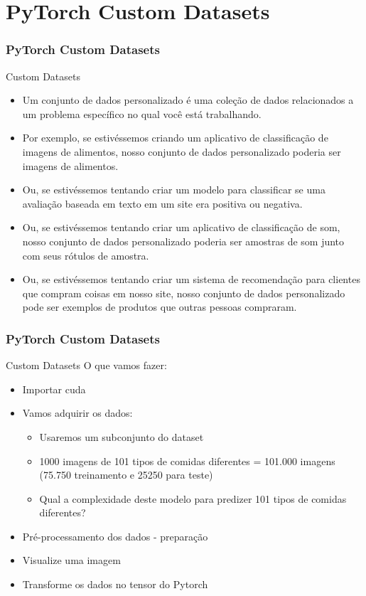 \documentclass{beamer}
\begin{document}
\section{PyTorch Custom Datasets}
\begin{frame}
	\frametitle{PyTorch Custom Datasets}
	\begin{block}{Custom Datasets}
		
		\begin{itemize}
			\item Um conjunto de dados personalizado é uma coleção de dados relacionados a um problema específico no qual você está trabalhando.
			\item Por exemplo, se estivéssemos criando um aplicativo de classificação de imagens de alimentos, nosso conjunto de dados personalizado poderia ser imagens de alimentos.
			\item Ou, se estivéssemos tentando criar um modelo para classificar se uma avaliação baseada em texto em um site era positiva ou negativa.
			\item Ou, se estivéssemos tentando criar um aplicativo de classificação de som, nosso conjunto de dados personalizado poderia ser amostras de som junto com seus rótulos de amostra.
			\item Ou, se estivéssemos tentando criar um sistema de recomendação para clientes que compram coisas em nosso site, nosso conjunto de dados personalizado pode ser exemplos de produtos que outras pessoas compraram.
		\end{itemize}
	\end{block}
\end{frame}
\begin{frame}
	\frametitle{PyTorch Custom Datasets}
	\begin{block}{Custom Datasets}
		O que vamos fazer:
		\begin{itemize}
			\item Importar cuda
			\item Vamos adquirir os dados:
			\begin{itemize}
				\item Usaremos um subconjunto do dataset \href{https://data.vision.ee.ethz.ch/cvl/datasets_extra/food-101/}{} 
				\item 1000 imagens de 101 tipos de comidas diferentes = 101.000 imagens (75.750 treinamento e 25250 para teste)
				\item Qual a complexidade deste modelo para predizer 101 tipos de comidas diferentes?
			\end{itemize}
			\item Pré-processamento dos dados - preparação
			\item Visualize uma imagem
			\item Transforme os dados no tensor do Pytorch
		\end{itemize}
	\end{block}
\end{frame}
\end{document}
